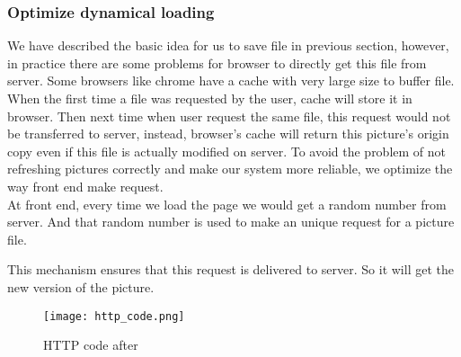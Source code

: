 \documentclass[a4paper]{article}
\begin{document}
\subsubsection{Optimize dynamical loading}
We have described the basic idea for us to save file in previous section, however, in practice there are some problems for browser to directly get this file from server. Some browsers like chrome have a cache with very large size to buffer file. When the first time a file was requested by the user, cache will store it in browser. Then next time when user request the same file, this request would not be transferred to server, instead, browser's cache will return this picture's origin copy even if this file is actually modified on server. To avoid the problem of not refreshing pictures correctly and make our system more reliable, we optimize the way front end make request.
\quad\\
At front end, every time we load the page we would get a random number from server. And that random number is used to make an unique request for a picture file.

This mechanism ensures that this request is delivered to server. So it will get the new version of the picture.
\begin{figure}[h]
    \centering
    \texttt{[image: http\_code.png]}
    \caption{HTTP code after}
    \label{http_code}
\end{figure}
\end{document}
